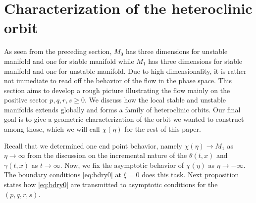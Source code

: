 \documentclass[a4paper,11pt]{article}
\theoremstyle{remark}
\begin{document}
\section{Characterization of the heteroclinic orbit} \label{sec:char}
As seen from the preceding section, $M_0$ has three dimensions for unstable manifold and one for stable manifold while $M_1$ has three dimensions for stable manifold and one for unstable manifold. Due to high dimensionality, it is rather not immediate to read off the behavior of the flow in the phase space. This section aims to develop a rough picture illustrating the flow mainly on the positive sector $p,q,r,s \ge0$. We discuss how the local stable and unstable manifolds extends globally and forms a family of heteroclinic orbits. Our final goal is to give a geometric characterization of the orbit we wanted to construct among those, which we will call $\chi(\eta)$ for the rest of this paper.

Recall that we determined one end point behavior, namely $\chi(\eta) \rightarrow M_1$ as $\eta \rightarrow \infty$ from the discussion on the incremental nature of the $\theta(t,x)$ and $\gamma(t,x)$ as $t \rightarrow \infty$. Now, we fix the asymptotic behavior of $\chi(\eta)$ as $\eta \rightarrow -\infty$. The boundary conditions \eqref{eq:bdry0} at $\xi=0$ does this task. Next proposition states how \eqref{eq:bdry0} are transmitted to asymptotic conditions for the $(p,q,r,s)$.
\end{document}
